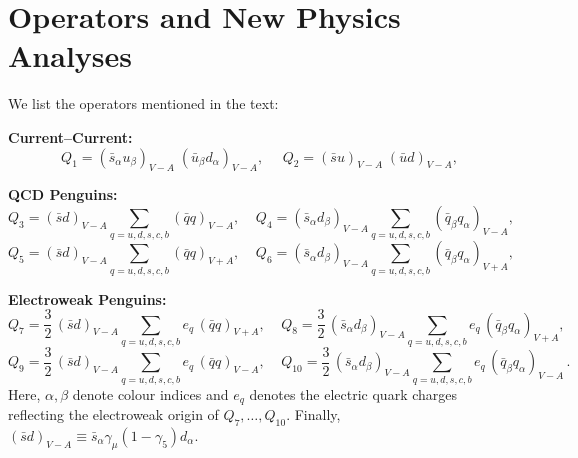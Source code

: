 \documentclass[12pt,a4paper]{article}
\begin{document}
\appendix
\section{Operators and New Physics Analyses}\label{OPE}
 We list the operators mentioned in the text:

{\bf Current--Current:}
\begin{equation}\label{O1s} 
Q_1 = (\bar s_{\alpha} u_{\beta})_{V-A}\;(\bar u_{\beta} d_{\alpha})_{V-A},
~~~~~~Q_2 = (\bar su)_{V-A}\;(\bar ud)_{V-A},
\end{equation}

{\bf QCD Penguins:}
\begin{equation}\label{O2s}
Q_3 = (\bar s d)_{V-A}\!\!\sum_{q=u,d,s,c,b}(\bar qq)_{V-A},~~~~~   
Q_4 = (\bar s_{\alpha} d_{\beta})_{V-A}\!\!\sum_{q=u,d,s,c,b}(\bar q_{\beta} 
       q_{\alpha})_{V-A} ,
\end{equation}
\begin{equation}\label{O3s}
Q_5 = (\bar s d)_{V-A}\!\!\sum_{q=u,d,s,c,b}(\bar qq)_{V+A},~~~~~
Q_6 = (\bar s_{\alpha} d_{\beta})_{V-A}\!\!\sum_{q=u,d,s,c,b}
      (\bar q_{\beta} q_{\alpha})_{V+A}, 
\end{equation}

{\bf Electroweak Penguins:}
\begin{equation}\label{O4s} 
Q_7 = \frac{3}{2}\,(\bar s d)_{V-A}\!\!\sum_{q=u,d,s,c,b} e_q\,(\bar qq)_{V+A}, 
~~~~~Q_8 = \frac{3}{2}\,(\bar s_{\alpha} d_{\beta})_{V-A}\!\!\sum_{q=u,d,s,c,b}
      e_q\,(\bar q_{\beta} q_{\alpha})_{V+A},
\end{equation}
\begin{equation}\label{O5s} 
 Q_9 = \frac{3}{2}\,(\bar s d)_{V-A}\!\!\sum_{q=u,d,s,c,b}e_q\,(\bar q q)_{V-A},
~~~~~Q_{10} =\frac{3}{2}\,
(\bar s_{\alpha} d_{\beta})_{V-A}\!\!\sum_{q=u,d,s,c,b}e_q\,
       (\bar q_{\beta}q_{\alpha})_{V-A} \,.
\end{equation}
Here, $\alpha,\beta$ denote colour indices and $e_q$ denotes the electric quark
charges reflecting the electroweak origin of $Q_7,\ldots,Q_{10}$. Finally,
$(\bar sd)_{V-A}\equiv \bar s_\alpha\gamma_\mu(1-\gamma_5) d_\alpha$. 
\end{document}
